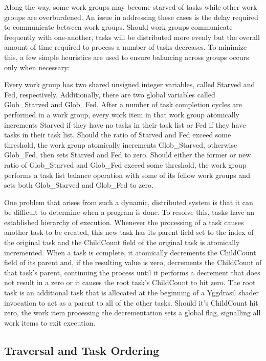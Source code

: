 \documentclass[onecolumn, draftclsnofoot,10pt, compsoc]{IEEEtran}
\begin{document}
Along the way, some work groups may become starved of tasks while other work groups are overburdened. An issue in addressing these cases is the delay required to communicate between work groups. Should work groups communicate frequently with one-another, tasks will be distributed more evenly but the overall amount of time required to process a number of tasks decreases. To minimize this, a few simple heuristics are used to ensure balancing across groups occurs only when necessary:

Every work group has two shared unsigned integer variables, called Starved and Fed, respectively. Additionally, there are two global variables called Glob\_Starved and Glob\_Fed.  After a number of task completion cycles are performed in a work group, every work item in that work group atomically increments Starved if they have no tasks in their task list or Fed if they have tasks in their task list. Should the ratio of Starved and Fed exceed some threshold, the work group atomically increments Glob\_Starved, otherwise Glob\_Fed, then sets Starved and Fed to zero. Should either the former or new ratio of Glob\_Starved and Glob\_Fed exceed some threshold, the work group performs a task list balance operation with some of its fellow work groups and sets both Glob\_Starved and Glob\_Fed to zero.

One problem that arises from such a dynamic, distributed system is that it can be difficult to determine when a program is done. To resolve this, tasks have an established hierarchy of execution. Whenever the processing of a task causes another task to be created, this new task has its parent field set to the index of the original task and the ChildCount field of the original task is atomically incremented. When a task is complete, it atomically decrements the ChildCount field of its parent and, if the resulting value is zero, decrements the ChildCount of that task’s parent, continuing the process until it performs a decrement that does not result in a zero or it causes the root task’s ChildCount to hit zero. The root task is an additional task that is allocated at the beginning of a Yggdrasil shader invocation to act as a parent to all of the other tasks. Should it’s ChildCount hit zero, the work item processing the decrementation sets a global flag, signalling all work items to exit execution.


\subsection{Traversal and Task Ordering}
\end{document}
